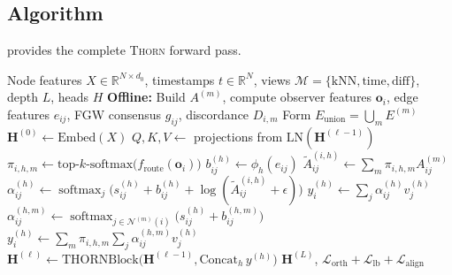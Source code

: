 \documentclass[11pt,a4paper]{article}
\newcommand{\thorn}{\textsc{Thorn}}
\newcommand{\RR}{\mathbb{R}}
\newcommand{\calM}{\mathcal{M}}
\newcommand{\calN}{\mathcal{N}}
\newcommand{\calL}{\mathcal{L}}
\DeclareMathOperator{\softmax}{softmax}
\begin{document}
\subsection{Algorithm}
\label{sec:algorithm}

 provides the complete \thorn{} forward pass.

\begin{algorithm}[t]
\caption{\thorn{}: Forward Pass}
\label{alg:thorn}
\begin{algorithmic}[1]
\Require Node features $X \in \RR^{N \times d_0}$, timestamps
  $t \in \RR^{N}$, views $\calM = \{\text{kNN}, \text{time},
  \text{diff}\}$, depth $L$, heads $H$
\Statex
\State \textbf{Offline:} Build $A^{(m)}$, compute observer features
  $\mathbf{o}_i$, edge features $e_{ij}$, FGW consensus $g_{ij}$,
  discordance $D_{i,m}$
\State Form $E_{\mathrm{union}} = \bigcup_m E^{(m)}$
\Statex
\State $\mathbf{H}^{(0)} \gets \mathrm{Embed}(X)$
  \State $Q, K, V \gets$ projections from
    $\mathrm{LN}(\mathbf{H}^{(\ell-1)})$
  \State $\pi_{i,h,m} \gets \text{top-}k\text{-softmax}\big(
    f_{\text{route}}(\mathbf{o}_i)\big)$
  \State $b_{ij}^{(h)} \gets \phi_h(e_{ij})$
    \State $\tilde{A}_{ij}^{(i,h)} \gets \sum_m \pi_{i,h,m}
      A_{ij}^{(m)}$
    \State $\alpha_{ij}^{(h)} \gets \softmax_j\!\big(
      s_{ij}^{(h)} + b_{ij}^{(h)} +
      \log(\tilde{A}_{ij}^{(i,h)} + \epsilon)\big)$
    \State $y_i^{(h)} \gets \sum_j \alpha_{ij}^{(h)} v_j^{(h)}$
  \Else
      \State $\alpha_{ij}^{(h,m)} \gets \softmax_{j \in
        \calN^{(m)}(i)}\!\big(s_{ij}^{(h)} + b_{ij}^{(h,m)}\big)$
    \EndFor
    \State $y_i^{(h)} \gets \sum_m \pi_{i,h,m} \sum_j
      \alpha_{ij}^{(h,m)} v_j^{(h)}$
  \EndIf
  \State $\mathbf{H}^{(\ell)} \gets \mathrm{THORNBlock}\!\big(
    \mathbf{H}^{(\ell-1)}, \mathrm{Concat}_h\, y^{(h)}\big)$
\EndFor
\State \Return $\mathbf{H}^{(L)}$, $\calL_{\mathrm{orth}} +
  \calL_{\mathrm{lb}} + \calL_{\mathrm{align}}$
\end{algorithmic}
\end{algorithm}

\end{document}
